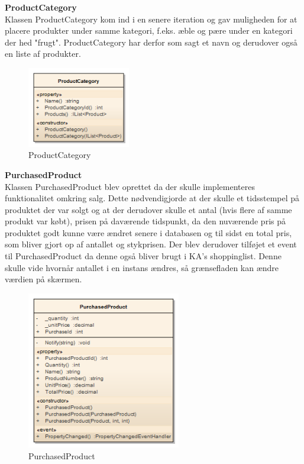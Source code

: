 \textbf{ProductCategory}\label{PRODUCTCATEGORY}\\
Klassen ProductCategory kom ind i en senere iteration og gav muligheden for at placere produkter under samme kategori, f.eks. æble og pære under en kategori der hed "frugt".
ProductCategory har derfor som sagt et navn og derudover også en liste af produkter. 

\begin{figure}[H]
    \centering
    \includegraphics[width=0.4\textwidth]{Systemdesign/SharedLib/Images/Klasser/Model/ProductCategory.png}
    \caption{ProductCategory}
    \label{fig:klasseModelPrdCtg}
\end{figure}


\textbf{PurchasedProduct}\\
Klassen PurchasedProduct blev oprettet da der skulle implementeres funktionalitet omkring salg. Dette nødvendigjorde at der skulle et tidsstempel på produktet der var solgt og at der derudover skulle et antal (hvis flere af samme produkt var købt), prisen på daværende tidspunkt, da den nuværende pris på produktet godt kunne være ændret senere i databasen og til sidst en total pris, som bliver gjort op af antallet og stykprisen. Der blev derudover tilføjet et event til PurchasedProduct da denne også bliver brugt i \gls{KA}'s shoppinglist. Denne skulle vide hvornår antallet i en instans ændres, så grænsefladen kan ændre værdien på skærmen.

\begin{figure}[H]
    \centering
    \includegraphics[width=0.6\textwidth]{Systemdesign/SharedLib/Images/Klasser/Model/PurchasedProduct.png}
    \caption{PurchasedProduct}
    \label{fig:klasseModelPurPrd}
\end{figure}


